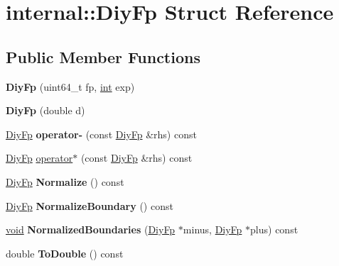 \hypertarget{structinternal_1_1_diy_fp}{}\section{internal\+:\+:Diy\+Fp Struct Reference}
\label{structinternal_1_1_diy_fp}
\subsection*{Public Member Functions}
\begin{DoxyCompactItemize}
\item 
\hypertarget{structinternal_1_1_diy_fp_a9a8f2f5c49dfa0dee4a527f0829cc2e5}{}{\bfseries Diy\+Fp} (uint64\+\_\+t fp, \hyperlink{_s_d_l__thread_8h_a6a64f9be4433e4de6e2f2f548cf3c08e}{int} exp)\label{structinternal_1_1_diy_fp_a9a8f2f5c49dfa0dee4a527f0829cc2e5}

\item 
\hypertarget{structinternal_1_1_diy_fp_adc132c7da4c8e3ee5ae12efdcf6dbf7c}{}{\bfseries Diy\+Fp} (double d)\label{structinternal_1_1_diy_fp_adc132c7da4c8e3ee5ae12efdcf6dbf7c}

\item 
\hypertarget{structinternal_1_1_diy_fp_ade3efb95107203f2327fc3d5a802d4b7}{}\hyperlink{structinternal_1_1_diy_fp}{Diy\+Fp} {\bfseries operator-\/} (const \hyperlink{structinternal_1_1_diy_fp}{Diy\+Fp} \&rhs) const \label{structinternal_1_1_diy_fp_ade3efb95107203f2327fc3d5a802d4b7}

\item 
\hyperlink{structinternal_1_1_diy_fp}{Diy\+Fp} \hyperlink{structinternal_1_1_diy_fp_ab536022d225b3014c98517a2dec4b986}{operator$\ast$} (const \hyperlink{structinternal_1_1_diy_fp}{Diy\+Fp} \&rhs) const 
\item 
\hypertarget{structinternal_1_1_diy_fp_adae1948b1bb65d950cd3801a4a2bb7fd}{}\hyperlink{structinternal_1_1_diy_fp}{Diy\+Fp} {\bfseries Normalize} () const \label{structinternal_1_1_diy_fp_adae1948b1bb65d950cd3801a4a2bb7fd}

\item 
\hypertarget{structinternal_1_1_diy_fp_a1a4589d19230c9930d7f3dd5a9b7f7e7}{}\hyperlink{structinternal_1_1_diy_fp}{Diy\+Fp} {\bfseries Normalize\+Boundary} () const \label{structinternal_1_1_diy_fp_a1a4589d19230c9930d7f3dd5a9b7f7e7}

\item 
\hypertarget{structinternal_1_1_diy_fp_a64e623c1742d1d5ad551ab456f0deb62}{}\hyperlink{_s_d_l__audio_8h_a52835ae37c4bb905b903cbaf5d04b05f}{void} {\bfseries Normalized\+Boundaries} (\hyperlink{structinternal_1_1_diy_fp}{Diy\+Fp} $\ast$minus, \hyperlink{structinternal_1_1_diy_fp}{Diy\+Fp} $\ast$plus) const \label{structinternal_1_1_diy_fp_a64e623c1742d1d5ad551ab456f0deb62}

\item 
\hypertarget{structinternal_1_1_diy_fp_a9bbdcfcf5d1b3a7b16a8f5f860d74038}{}double {\bfseries To\+Double} () const \label{structinternal_1_1_diy_fp_a9bbdcfcf5d1b3a7b16a8f5f860d74038}

\end{DoxyCompactItemize}
